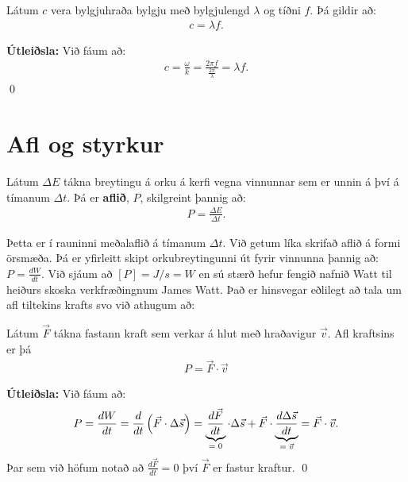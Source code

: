 \ifdefined \wholebook \else\documentclass[oneside]{book}\usepackage{EdlBook}\graphicspath{{figures/}}
\begin{document}
\begin{tcolorbox}
\begin{theorem}
Látum $c$ vera bylgjuhraða bylgju með bylgjulengd $\lambda$ og tíðni $f$. Þá gildir að:
\begin{align*}
    c = \lambda f.
\end{align*}
\end{theorem}
\end{tcolorbox}

\textbf{Útleiðsla:} Við fáum að:
\begin{align*}
    c = \frac{\omega}{k} = \frac{2\pi f}{\frac{2\pi}{\lambda}} = \lambda f.
\end{align*}
\qed

\section{Afl og styrkur}

\begin{tcolorbox}
\begin{definition}
Látum $\Delta E$ tákna breytingu á orku á kerfi vegna vinnunnar sem er unnin á því á tímanum $\Delta t$. Þá er \textbf{aflið}, $P$, skilgreint þannig að:
\begin{align*}
    P = \frac{\Delta E}{\Delta t}.
\end{align*}
\end{definition}
\end{tcolorbox}

Þetta er í rauninni meðalaflið á tímanum $\Delta t$. Við getum líka skrifað aflið á formi örsmæða. Þá er yfirleitt skipt orkubreytingunni út fyrir vinnunna þannig að: $P = \frac{d W}{dt}$. Við sjáum að $[P] = \si{J/s} = \si{W}$ en sú stærð hefur fengið nafnið Watt til heiðurs skoska verkfræðingnum James Watt. Það er hinsvegar eðlilegt að tala um afl tiltekins krafts svo við athugum að:

\begin{tcolorbox}
\begin{theorem}
Látum $\vec{F}$ tákna fastann kraft sem verkar á hlut með hraðavigur $\vec{v}$. Afl kraftsins er þá
\begin{align*}
    P = \Vec{F} \cdot \Vec{v}
\end{align*}
\end{theorem}
\end{tcolorbox}

\textbf{Útleiðsla:} Við fáum að:
\begin{align*}
    P = \frac{dW}{dt} = \frac{d}{dt}\left( \Vec{F} \cdot \Delta \Vec{s} \right) = \underbrace{\frac{d\Vec{F}}{dt}}_\textrm{$=0$} \cdot \Delta \Vec{s} + \Vec{F} \cdot \underbrace{\frac{d\Delta \Vec{s}}{dt}}_\textrm{$= \vec{v}$} = \Vec{F} \cdot \Vec{v}.
\end{align*}
Þar sem við höfum notað að $\frac{d \Vec{F}}{dt} = 0$ því $\Vec{F}$ er fastur kraftur.
\qed
\end{document}
